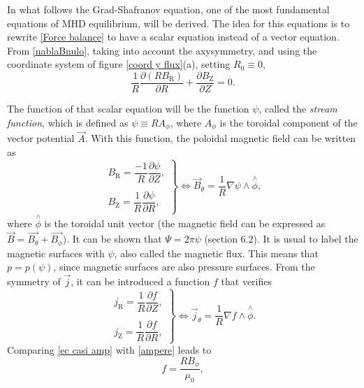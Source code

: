 \documentclass[a4paper,12pt,oneside]{book}
\newcommand{\p}{\partial}
\begin{document}
In what follows the Grad-Shafranov equation, one of the most fundamental equations of MHD equilibrium, will be derived. The idea for this equations is to rewrite \eqref{Force balance} to have a scalar equation instead of a vector equation. From \eqref{nablaBnulo}, taking into account the axysymmetry, and using the coordinate system of figure \ref{coord y flux}(a), setting $R_0 \equiv 0$,
%
\begin{equation}
\dfrac{1}{R} \dfrac{\p (RB_\text{R})}{\p R}+ \dfrac{\p B_\text{Z}}{\p Z}=0.
\end{equation}

The function of that scalar equation will be the function $\psi$, called the \textit{stream function}, which is defined as $\psi \equiv R A_\phi$, where $A_\phi$ is the toroidal component of the vector potential $\vec{A}$. With this function, the poloidal magnetic field can be written as
%
\begin{equation}\label{ec 1}
\left.
\begin{array}{c}
B_\text{R}=\dfrac{-1}{R} \dfrac{\p \psi}{\p Z}, \\
\\
 B_\text{Z}=\dfrac{1}{R} \dfrac{\p \psi}{\p R},
\end{array}
\right\}
\Leftrightarrow \vec{B}_\theta=\dfrac{1}{R} \nabla \psi \wedge \stackrel{\wedge}{\phi},
\end{equation}
%
where $\stackrel{\wedge}{\phi}$ is the toroidal unit vector (the magnetic field can be expressed as $\vec{B}=\vec{B_\theta} +\vec{B_\phi}$). It can be shown that $\Psi=2 \pi \psi$ \cite{Freidberg} (section 6.2). It is usual to label the magnetic surfaces with $\psi$, also called the magnetic flux. This means that $p=p(\psi)$, since magnetic surfaces are also pressure surfaces.  From the symmetry of $\vec{j}$, it can be introduced a function $f$ that verifies
%
\begin{equation} \label{ec casi amp}
\left.
\begin{array}{c}
j_\text{R}=\dfrac{1}{R} \dfrac{\p f}{\p Z}, \\
\\
 j_\text{Z}=\dfrac{1}{R} \dfrac{\p f}{\p R},
\end{array}
\right\}
\Leftrightarrow \vec{j}_\theta=\dfrac{1}{R}\nabla f \wedge \stackrel{\wedge}{\phi}.
\end{equation}
%
Comparing \eqref{ec casi amp} with \eqref{ampere} leads to
%
\begin{equation}\label{ec_B_f}
f=\dfrac{R B_\phi}{\mu_0},
\end{equation}
\end{document}
